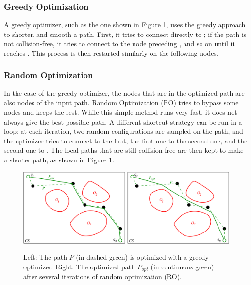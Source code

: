 \subsubsection{Greedy Optimization}

A greedy optimizer, such as the one shown in Figure
\ref{fig:chap1-optimizers}, uses the greedy approach to shorten and
smooth a path. First, it tries to connect directly  to
; if the path is not collision-free, it tries to connect
 to the node preceding , and so on until it
reaches . This process is then restarted similarly on the
following nodes.

\subsubsection{Random Optimization}
\label{subsubsec:chap3-random-optimization}

In the case of the greedy optimizer, the nodes that are in the
optimized path are also nodes of the input path. Random Optimization
(RO) tries to bypass some nodes and keeps the rest. While this simple
method runs very fast, it does not always give the best possible
path. A different shortcut strategy can be run in a loop: at each
iteration, two random configurations are sampled on the path, and the
optimizer tries to connect  to the first, the first one to
the second one, and the second one to . The local paths that
are still collision-free are then kept to make a shorter path, as
shown in Figure \ref{fig:chap1-optimizers}.

\begin{figure}
  \centering
      {\includegraphics[width = \linewidth]
        {src/chap1-path-optimization/optimizers.pdf}}
      \caption{Left: The path $P$ (in dashed green) is optimized with
        a greedy optimizer. Right: The optimized path $P_{opt}$ (in
        continuous green) after several iterations of random
        optimization (RO).}
      \label{fig:chap1-optimizers}
\end{figure}

